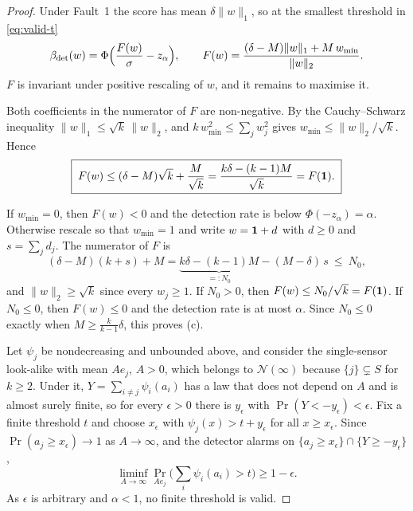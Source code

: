 \begin{proof}
 Under Fault~1 the score has mean $\delta\|w\|_1$, so at the smallest threshold in \cref{eq:valid-t}
\begin{equation}\label{eq:F}
  \beta_{\mathrm{det}}(w)=\Phi\Big(\frac{F(w)}{\sigma}-z_\alpha\Big),
  \qquad
  F(w)=\frac{(\delta-M)\|w\|_1+M\,w_{\min}}{\|w\|_2}.
\end{equation}
$F$ is invariant under positive rescaling of $w$, and it remains to maximise it.

 Both coefficients in the numerator of $F$ are non-negative. By the Cauchy--Schwarz inequality $\|w\|_1\le\sqrt k\,\|w\|_2$, and $k\,w_{\min}^2\le\sum_jw_j^2$ gives $w_{\min}\le\|w\|_2/\sqrt k$. Hence
\begin{equation}\label{eq:F-small-M}
  \boxed{\;F(w)\le(\delta-M)\sqrt k+\frac{M}{\sqrt k}=\frac{k\delta-(k-1)M}{\sqrt k}=F(\mathbf{1}).\;}
\end{equation}

 If $w_{\min}=0$, then $F(w)<0$ and the detection rate is below $\Phi(-z_\alpha)=\alpha$. Otherwise rescale so that $w_{\min}=1$ and write $w=\mathbf{1}+d$ with $d\ge0$ and $s=\sum_jd_j$. The numerator of $F$ is
\begin{equation}\label{eq:numerator}
  (\delta-M)(k+s)+M=\underbrace{k\delta-(k-1)M}_{=:N_0}-(M-\delta)\,s\ \le\ N_0,
\end{equation}
and $\|w\|_2\ge\sqrt k$ since every $w_j\ge1$. If $N_0>0$, then $F(w)\le N_0/\sqrt k=F(\mathbf{1})$. If $N_0\le0$, then $F(w)\le0$ and the detection rate is at most $\alpha$. Since $N_0\le0$ exactly when $M\ge\frac{k}{k-1}\delta$, this proves (c).

 Let $\psi_j$ be nondecreasing and unbounded above, and consider the single-sensor look-alike with mean $Ae_j$, $A>0$, which belongs to $\mathcal N(\infty)$ because $\{j\}\subsetneq S$ for $k\ge2$. Under it, $Y=\sum_{i\ne j}\psi_i(a_i)$ has a law that does not depend on $A$ and is almost surely finite, so for every $\epsilon>0$ there is $y_\epsilon$ with $\Pr(Y<-y_\epsilon)<\epsilon$. Fix a finite threshold $t$ and choose $x_\epsilon$ with $\psi_j(x)>t+y_\epsilon$ for all $x\ge x_\epsilon$. Since $\Pr(a_j\ge x_\epsilon)\to1$ as $A\to\infty$, and the detector alarms on $\{a_j\ge x_\epsilon\}\cap\{Y\ge-y_\epsilon\}$,
\begin{equation}\label{eq:loud}
  \boxed{\;\liminf_{A\to\infty}\Pr_{Ae_j}\Big(\sum_i\psi_i(a_i)>t\Big)\ge1-\epsilon .\;}
\end{equation}
As $\epsilon$ is arbitrary and $\alpha<1$, no finite threshold is valid.
\end{proof}

